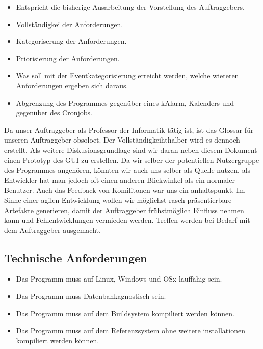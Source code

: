 \documentclass[11pt,titelpage]{scrartcl}
\begin{document}
\begin{itemize}
\item Entspricht die bisherige Ausarbeitung der Vorstellung des Auftraggebers.
\item Vollständigkei der Anforderungen.
\item Kategoriserung der Anforderungen.
\item Priorisierung der Anforderungen.
\item Was soll mit der Eventkategorisierung erreicht werden, welche wieteren Anforderungen ergeben sich daraus.
\item Abgrenzung des Programmes gegenüber eines kAlarm, Kalenders und gegenüber des Cronjobs.
\end{itemize}
Da unser Auftraggeber als Professor der Informatik tätig ist, ist das Glossar für unseren Auftraggeber obsoloet. Der Vollständigkeihthalber wird es dennoch erstellt. 
Als weitere Diskusionsgrundlage sind wir daran neben diesem Dokument einen Prototyp des GUI zu erstellen.
Da wir selber der potentiellen Nutzergruppe des Programmes angehören, könnten wir auch uns selber als Quelle nutzen, als Entwickler hat man jedoch oft einen anderen Blickwinkel als ein normaler Benutzer.
Auch das Feedback von Komilitonen war uns ein anhaltspunkt.
Im Sinne einer agilen Entwicklung wollen wir möglichst rasch präsentierbare Artefakte generieren, damit der Auftraggeber frühstmöglich Einfluss nehmen kann und Fehlentwicklungen vermieden werden. Treffen werden bei Bedarf mit dem Auftraggeber ausgemacht.


\subsection{Technische Anforderungen}

\begin{itemize}
 \item Das Programm muss auf Linux, Windows und OSx lauffähig sein.
 \item Das Programm muss Datenbankagnostisch sein.
 \item Das Programm muss auf dem Buildsystem kompiliert werden können.
 \item Das Programm muss auf dem Referenzsystem ohne weitere installationen  kompiliert werden können.
\end{itemize}
\end{document}
